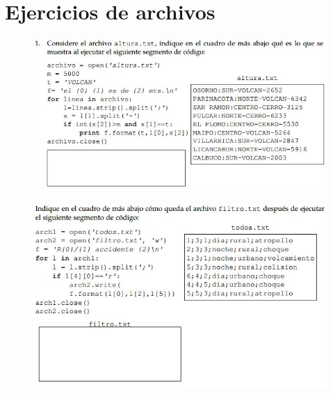 \section{Ejercicios de archivos}
\begin{figure}[h]
    \centering
    \includegraphics{Imagenes/imagen2.jpg}
\end{figure}
\begin{figure}[h]
    \centering
    \includegraphics{Imagenes/imagen3.jpg}
\end{figure}